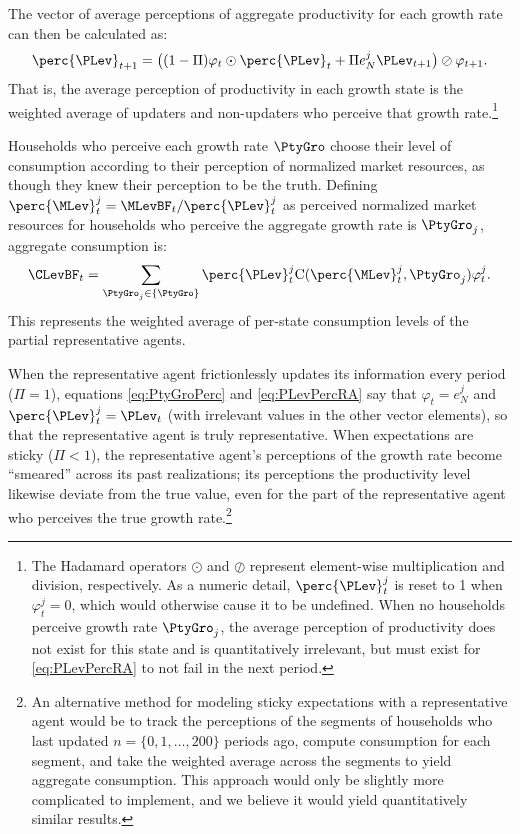 The vector of average perceptions of aggregate productivity for each growth
rate can then be calculated as:
\begin{equation}\label{eq:PLevPercRA}
\perc{\PLev}_{t+1} = \big((1 - \Pi) \varphi_{t} \odot \perc{\PLev}_t + \Pi e_N^j \PLev_{t+1} \big) \oslash \varphi_{t+1}.
\end{equation}
That is, the average perception of productivity in each growth state is the weighted
average of updaters and non-updaters who perceive that growth rate.\footnote{The
Hadamard operators $\odot$ and $\oslash$ represent element-wise multiplication and
division, respectively. As a numeric detail, $\perc{\PLev}_t^j$ is reset to 1 when $\varphi_t^j=0$,
which would otherwise cause it to be undefined.  When no households perceive growth
rate $\PtyGro_j$, the average perception of productivity does not exist for this state and is quantitatively
irrelevant, but must exist for \eqref{eq:PLevPercRA} to not fail in the next period.}

Households who perceive each growth rate $\PtyGro$ choose their level of consumption according to their perception of normalized market resources, as though they knew their perception to be the truth.  Defining $\perc{\MLev}_t^j = \MLevBF_t/\perc{\PLev}_t^j$ as perceived normalized market resources for households who perceive the aggregate growth rate is $\PtyGro_j$, aggregate consumption is:
\begin{equation}\label{eq:cLvlRA}
\CLevBF_t = \sum_{\PtyGro_j \in \{\PtyGro\}} \perc{\PLev}_t^j \text{C}(\perc{\MLev}_t^j,\PtyGro_j) \varphi_t^j.
\end{equation}
This represents the weighted average of per-state consumption levels of the partial
representative agents.

When the representative agent frictionlessly updates its information every period ($\Pi=1$),
equations \eqref{eq:PtyGroPerc} and \eqref{eq:PLevPercRA} say that $\varphi_t = e_N^j$
and $\perc{\PLev}_t^j = \PLev_t$ (with irrelevant values in the other vector elements), so
that the representative agent is truly representative.  When expectations are sticky ($\Pi < 1$),
the representative agent's perceptions of the growth rate become ``smeared'' across its
past realizations; its perceptions the productivity level likewise deviate from the true value,
even for the part of the representative agent who perceives the true growth rate.\footnote{An alternative method for modeling sticky expectations with a representative agent would be to track the
perceptions of the segments of households who last updated $n=\{0,1,\ldots,200\}$
periods ago, compute consumption for each segment, and take the weighted average
across the segments to yield aggregate consumption.  This approach would only be
slightly more complicated to implement, and we believe it would yield quantitatively
similar results.}



